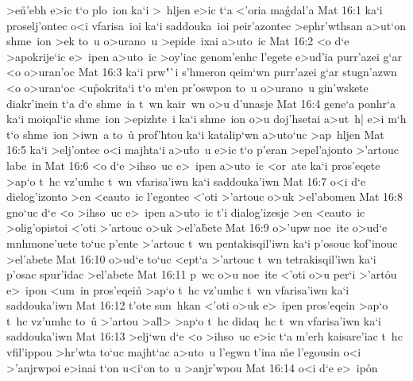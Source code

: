 >e\r{n}'ebh
e>ic
t`o
plo~ion
ka`i
>~hljen
e>ic
t`a
<'oria
ma\r{g}dal'a\bibvsend
{}
\vs Mat 16:1
ka`i
proselj'ontec
o<i
vfarisa~ioi
ka`i
saddouka~ioi
peir'azontec
>ephr'wthsan
a>ut`on
shme~ion
>ek
to~u
o>urano~u
>epide~ixai
a>uto~ic\bibvsend
\vs Mat 16:2
<o
d`e
>apokrije`ic
e>~ipen
a>uto~ic
>oy'iac
genom'enhc
l'egete
e>ud'ia
purr'azei
g`ar
<o
o>uran'oc\bibvsend
\vs Mat 16:3
ka`i
prw"`i
s'hmeron
qeim`wn
purr'azei
g`ar
stugn'azwn
<o
o>uran`oc
<u\r{p}okrita`i
t`o
m`en
pr'oswpon
to~u
o>urano~u
gin'wskete
diakr'inein
t`a
d`e
shme~ia
t~wn
kair~wn
o>u
d'unasje\bibvsend
\vs Mat 16:4
gene`a
ponhr`a
ka`i
moiqal`ic
shme~ion
>epizhte~i
ka`i
shme~ion
o>u
doj'hsetai
a>ut~h|
e>i
m`h
t`o
shme~ion
>iwn~a
to~u\r{}
prof'htou
ka`i
katalip`wn
a>uto`uc
>ap~hljen\bibvsend
\vs Mat 16:5
ka`i
>elj'ontec
o<i
majhta`i
a>u\r{t}o~u
e>ic
t`o
p'eran
>epel'ajonto
>'artouc
labe~in\bibvsend
\vs Mat 16:6
<o
d`e
>ihso~uc
e>~ipen
a>uto~ic
<or~ate
ka`i
pros'eqete
>ap`o
t~hc
vz'umhc
t~wn
vfarisa'iwn
ka`i
saddouka'iwn\bibvsend
\vs Mat 16:7
o<i
d`e
dielog'izonto
>en
<eauto~ic
l'egontec
<'oti
>'artouc
o>uk
>el'abomen\bibvsend
\vs Mat 16:8
gno`uc
d`e
<o
>ihso~uc
e>~ipen
a>u\r{t}o~ic
t'i
dialog'izesje
>en
<eauto~ic
>olig'opistoi
<'oti
>'artouc
o>uk
>el'a\r{b}ete\bibvsend
{}
\vs Mat 16:9
o>'upw
noe~ite
o>ud`e
mnhmone'uete
to`uc
p'ente
>'artouc
t~wn
pentakisqil'iwn
ka`i
p'osouc
kof'inouc
>el'abete\bibvsend
\vs Mat 16:10
o>ud`e
to`uc
<ept`a
>'artouc
t~wn
tetrakisqil'iwn
ka`i
p'osac
spur'idac
>el'abete\bibvsend
\vs Mat 16:11
p~wc
o>u
noe~ite
<'oti
o>u
per`i
>'art\r{o}u
e>~ipon
<um~in
pros'eqei\r{n}
>ap`o
t~hc
vz'umhc
t~wn
vfarisa'iwn
ka`i
saddouka'iwn\bibvsend
\vs Mat 16:12
t'ote
sun~hkan
<'oti
o>uk
e>~ipen
pros'eqein
>ap`o
t~hc
vz'umhc
to~u\r{}
>'artou
>al\r{l}>
>ap`o
t~hc
didaq~hc
t~wn
vfarisa'iwn
ka`i
saddouka'iwn\bibvsend
\vs Mat 16:13
>elj`wn
d`e
<o
>ihso~uc
e>ic
t`a
m'erh
kaisare'iac
t~hc
vfil'ippou
>hr'wta
to`uc
majht`ac
a>uto~u
l'egwn
t'ina
\r{m}e
l'egousin
o<i
>'anjrwpoi
e>inai
t`on
u<i`on
to~u
>anjr'wpou\bibvsend
\vs Mat 16:14
o<i
d`e
e>~ip\r{o}n
